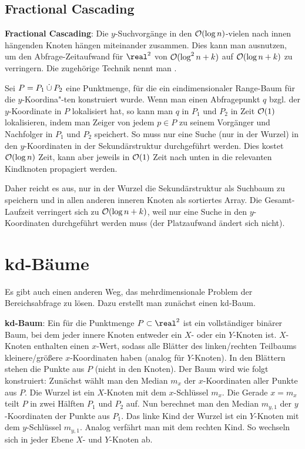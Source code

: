 \subsection{%
    Fractional Cascading%
}

\textbf{Fractional Cascading}:
Die $y$-Suchvorgänge in den $\mathcal{O}(\log n)$-vielen nach innen hängenden Knoten hängen miteinander
zusammen.
Dies kann man ausnutzen, um den Abfrage-Zeitaufwand für $\real^2$
von $\mathcal{O}(\log^2 n + k)$ auf $\mathcal{O}(\log n + k)$ zu verringern.
Die zugehörige Technik nennt man .

Sei $P = P_1 \mathbin{\dot{\cup}} P_2$ eine Punktmenge, für die ein eindimensionaler Range-Baum für
die $y$-Koordina"-ten konstruiert wurde.
Wenn man einen Abfragepunkt $q$ bzgl. der $y$-Koordinate in $P$ lokalisiert hat,
so kann man $q$ in $P_1$ und $P_2$ in Zeit $\mathcal{O}(1)$ lokalisieren,
indem man Zeiger von jedem $p \in P$ zu seinem Vorgänger und Nachfolger in $P_1$ und $P_2$
speichert.
So muss nur eine Suche (nur in der Wurzel) in den $y$-Koordinaten in der Sekundärstruktur
durchgeführt werden.
Dies kostet $\mathcal{O}(\log n)$ Zeit, kann aber jeweils in $\mathcal{O}(1)$ Zeit nach unten in die relevanten
Kindknoten propagiert werden.

Daher reicht es aus, nur in der Wurzel die Sekundärstruktur als Suchbaum zu speichern und
in allen anderen inneren Knoten als sortiertes Array.
Die Gesamt-Laufzeit verringert sich zu $\mathcal{O}(\log n + k)$, weil nur eine Suche in den $y$-Koordinaten
durchgeführt werden muss
(der Platzaufwand ändert sich nicht).

\pagebreak

\section{%
    kd-Bäume%
}

Es gibt auch einen anderen Weg, das mehrdimensionale Problem der Bereichsabfrage zu lösen.
Dazu erstellt man zunächst einen kd-Baum.

\textbf{kd-Baum}:
Ein  für die Punktmenge $P \subset \real^2$ ist ein vollständiger binärer Baum,
bei dem jeder innere Knoten entweder ein $X$- oder ein $Y$-Knoten ist.
$X$-Knoten enthalten einen $x$-Wert, sodass alle Blätter des linken/rechten Teilbaums
kleinere/größere $x$-Koordinaten haben (analog für $Y$-Knoten).
In den Blättern stehen die Punkte aus $P$ (nicht in den Knoten).
Der Baum wird wie folgt konstruiert:
Zunächst wählt man den Median $m_x$ der $x$-Koordinaten aller Punkte aus $P$.
Die Wurzel ist ein $X$-Knoten mit dem $x$-Schlüssel $m_x$.
Die Gerade $x = m_x$ teilt $P$ in zwei Hälften $P_1$ und $P_2$ auf.
Nun berechnet man den Median $m_{y,1}$ der $y$-Koordinaten der Punkte aus $P_1$.
Das linke Kind der Wurzel ist ein $Y$-Knoten mit dem $y$-Schlüssel $m_{y,1}$.
Analog verfährt man mit dem rechten Kind.
So wechseln sich in jeder Ebene $X$- und $Y$-Knoten ab.

